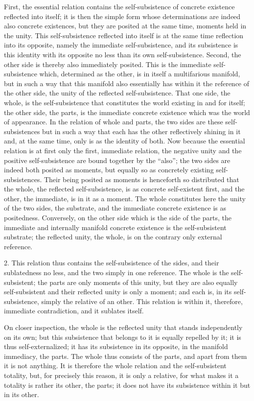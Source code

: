 First, the essential relation contains the self-subsistence
of concrete existence reflected into itself;
it is then the simple form whose determinations are
indeed also concrete existences,
but they are posited at the same time,
moments held in the unity.
This self-subsistence reflected into itself is
at the same time reflection into its opposite,
namely the immediate self-subsistence,
and its subsistence is this identity with its opposite
no less than its own self-subsistence.
Second, the other side is
thereby also immediately posited.
This is the immediate self-subsistence
which, determined as the other,
is in itself a multifarious manifold,
but in such a way that this manifold also essentially
has within it the reference of the other side,
the unity of the reflected self-subsistence.
That one side, the whole, is the self-subsistence
that constitutes the world existing in and for itself;
the other side, the parts,
is the immediate concrete existence
which was the world of appearance.
In the relation of whole and parts,
the two sides are these self-subsistences
but in such a way that each has the other
reflectively shining in it
and, at the same time, only is as the identity of both.
Now because the essential relation is
at first only the first, immediate relation,
the negative unity and the positive self-subsistence
are bound together by the “also”;
the two sides are indeed both posited as moments,
but equally so as concretely existing self-subsistences.
Their being posited as moments is henceforth so distributed
that the whole, the reflected self-subsistence, is
as concrete self-existent first,
and the other, the immediate, is in it as a moment.
The whole constitutes here the
unity of the two sides, the substrate,
and the immediate concrete existence is as positedness.
Conversely, on the other side which is the side of the parts,
the immediate and internally manifold concrete existence is
the self-subsistent substrate;
the reflected unity, the whole,
is on the contrary only external reference.

2. This relation thus contains
the self-subsistence of the sides,
and their sublatedness no less,
and the two simply in one reference.
The whole is the self-subsistent;
the parts are only moments of this unity,
but they are also equally self-subsistent
and their reflected unity is only a moment;
and each is, in its self-subsistence,
simply the relative of an other.
This relation is within it, therefore,
immediate contradiction, and it sublates itself.

On closer inspection,
the whole is the reflected unity
that stands independently on its own;
but this subsistence that belongs to it
is equally repelled by it;
it is thus self-externalized;
it has its subsistence in its opposite,
in the manifold immediacy, the parts.
The whole thus consists of the parts,
and apart from them it is not anything.
It is therefore the whole relation
and the self-subsistent totality,
but, for precisely this reason,
it is only a relative,
for what makes it a totality is
rather its other, the parts;
it does not have its subsistence
within it but in its other.

